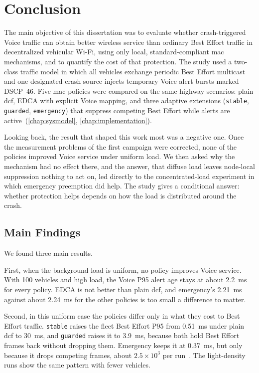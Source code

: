 \chapter{Conclusion}
\label{chap:conclusion}

The main objective of this dissertation was to evaluate whether crash-triggered Voice traffic can obtain better wireless service than ordinary Best Effort traffic in decentralized vehicular Wi-Fi, using only local, standard-compliant \gls{mac} mechanisms, and to quantify the cost of that protection.
The study used a two-class traffic model in which all vehicles exchange periodic Best Effort multicast and one designated crash source injects temporary Voice alert bursts marked DSCP~46.
Five \gls{mac} policies were compared on the same highway scenarios: plain \gls{dcf}, EDCA with explicit Voice mapping, and three adaptive extensions (\texttt{stable}, \texttt{guarded}, \texttt{emergency}) that suppress competing Best Effort while alerts are active~(\autoref{chap:sysmodel}, \autoref{chap:implementation}).

Looking back, the result that shaped this work most was a negative one.
Once the measurement problems of the first campaign were corrected, none of the policies improved Voice service under uniform load.
We then asked why the mechanism had no effect there, and the answer, that diffuse load leaves node-local suppression nothing to act on, led directly to the concentrated-load experiment in which emergency preemption did help.
The study gives a conditional answer: whether protection helps depends on how the load is distributed around the crash.

\section{Main Findings}
\label{sec:conc:findings}

We found three main results.

First, when the background load is uniform, no policy improves Voice service.
With 100 vehicles and high load, the Voice P95 alert age stays at about 2.2~ms for every policy.
EDCA is not better than plain \gls{dcf}, and emergency's 2.21~ms against about 2.24~ms for the other policies is too small a difference to matter.

Second, in this uniform case the policies differ only in what they cost to Best Effort traffic.
\texttt{stable} raises the fleet Best Effort P95 from 0.51~ms under plain \gls{dcf} to 30~ms, and \texttt{guarded} raises it to 3.9~ms, because both hold Best Effort frames back without dropping them.
Emergency keeps it at 0.37~ms, but only because it drops competing frames, about $2.5\times10^{3}$ per run~\cite{aguiar2026_veins_qos}.
The light-density runs show the same pattern with fewer vehicles.

